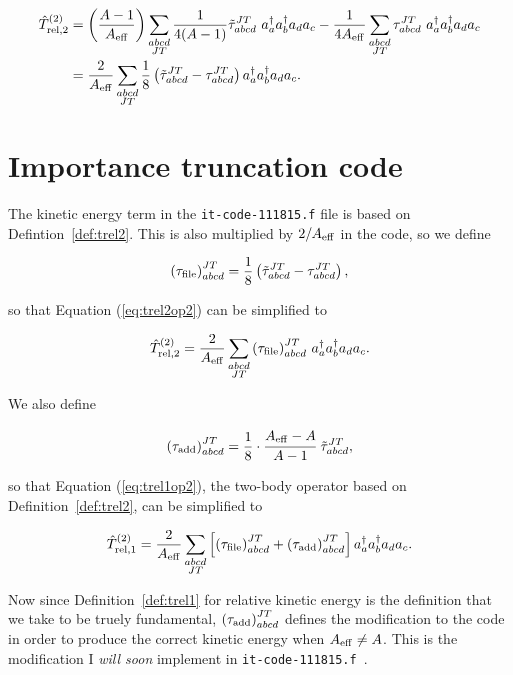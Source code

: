 \documentclass{article}
\def\aeff{A_{\rm{eff}}}
\def\trelopi_#1^#2{\hat{T}_{\rm{rel}, #1}^{#2}}
\def\creop{a^{\dagger}}
\def\annop{a}
\begin{document}
\begin{equation}\label{eq:trel2op2}
  \begin{aligned}
    \trelopi_2^{(2)} &= \left(\frac{A-1}{\aeff}\right)
    \displaystyle\sum_{\substack{abcd\\JT}} \frac{1}{4(A-1)}
    \tilde{\tau}_{abcd}^{JT}~\creop_a\creop_b\annop_d\annop_c
    -\frac{1}{4\aeff} \displaystyle\sum_{\substack{abcd\\JT}}
    \tau_{abcd}^{JT}~\creop_a\creop_b\annop_d\annop_c\\
    &= \frac{2}{\aeff} \displaystyle\sum_{\substack{abcd\\JT}}
    \frac{1}{8}\left( \tilde{\tau}_{abcd}^{JT} - \tau_{abcd}^{JT} \right)
    \creop_a\creop_b\annop_d\annop_c.
  \end{aligned}
\end{equation}

\section{Importance truncation code}

The kinetic energy term in the \texttt{it-code-111815.f} file is based
on Defintion~\ref{def:trel2}. This is also multiplied by $2/A_{\rm{eff}}$ in
the code, so we define

\begin{equation}
  {(\tau_{\rm{file}})}_{abcd}^{JT} = \frac{1}{8}
  \left( \tilde{\tau}_{abcd}^{JT} - \tau_{abcd}^{JT} \right),
\end{equation}

so that Equation (\ref{eq:trel2op2}) can be simplified to

\begin{equation}
  \trelopi_2^{(2)} = \frac{2}{\aeff}
  \displaystyle\sum_{\substack{abcd\\JT}} {(\tau_{\rm{file}})}_{abcd}^{JT}
  ~\creop_a\creop_b\annop_d\annop_c.
\end{equation}

We also define

\begin{equation}
  {(\tau_{\rm{add}})}_{abcd}^{JT} = \frac{1}{8}\cdot
  \cfrac{\aeff-A}{A-1}~\tilde{\tau}_{abcd}^{JT},
\end{equation}

so that Equation (\ref{eq:trel1op2}), the two-body operator based on
Definition~\ref{def:trel2}, can be simplified to

\begin{equation}
  \trelopi_1^{(2)} = \frac{2}{\aeff}
  \displaystyle\sum_{\substack{abcd\\JT}} \left[ 
  {(\tau_{\rm{file}})}_{abcd}^{JT} + {(\tau_{\rm{add}})}_{abcd}^{JT}
  \right]\creop_a\creop_b\annop_d\annop_c.
\end{equation}

Now since Definition~\ref{def:trel1} for relative kinetic energy is the
definition that we take to be truely fundamental,
${(\tau_{\rm{add}})}_{abcd}^{JT}$ defines
the modification to the code in order to produce the correct
kinetic energy when $\aeff\neq A$.
This is the modification I \textit{will soon} implement in
\texttt{it-code-111815.f}~\cite{github}.



\end{document}
